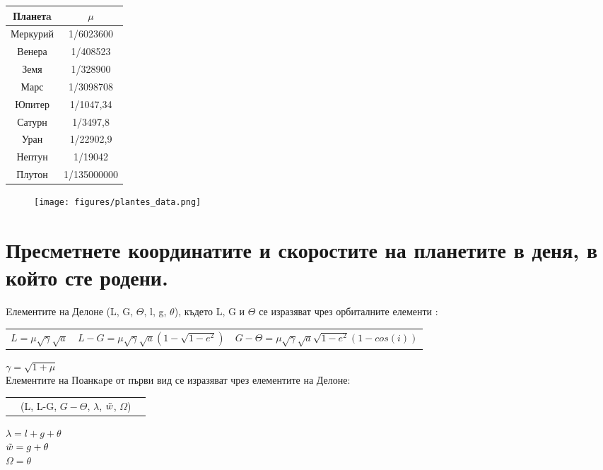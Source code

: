 \documentclass{article}
\begin{document}
\begin{center}
 \begin{tabular}{||c | c||} 
 \hline
 Планетa & $\mu$  \\ [0.5ex] 
 \hline\hline
 Меркурий & 1/6023600 \\ 
 \hline
 Венера & 1/408523  \\
 \hline
 Земя & 1/328900  \\
 \hline
 Марс & 1/3098708  \\
 \hline
 Юпитер & 1/1047,34 \\
 \hline
 Сатурн & 1/3497,8  \\
 \hline
 Уран & 1/22902,9  \\
 \hline
 Нептун & 1/19042  \\
 \hline
 Плутон & 1/135000000  \\[1ex]
 \hline
\end{tabular}
\end{center}

\begin{figure}[h]
\centering
\texttt{[image: figures/plantes\_data.png]}
\end{figure}

\section{Пресметнете координатите и скоростите на планетите в деня, в който сте родени.}
Eлементите на Делоне (L, G, $\Theta$, l, g, $\theta$), където L, G и $\Theta$ се изразяват чрез орбиталните елементи : \\

\setlength{\tabcolsep}{30pt} %
\renewcommand{\arraystretch}{1.5} %

\begin{center}
\begin{tabular}{ c |  c  | c } 

 $L = \mu \sqrt{\gamma} \sqrt{a} $   & $L - G = \mu \sqrt{\gamma} \sqrt{a}(1-\sqrt{1-e^2})$ & $G - \Theta = \mu  \sqrt{\gamma}  \sqrt{a}  \sqrt{1-e^2} (1- cos(i)) $ \\ 

\end{tabular}
\end{center}

 $\gamma = \sqrt{1+\mu}$ \\


\setlength{\tabcolsep}{6pt} %
\renewcommand{\arraystretch}{1} %
\noindent Елементите на Поанкaре от първи вид се изразяват чрез елементите на Делоне:\\
\begin{center}
\begin{tabular}{ c   c   c } 
    &(L, L-G, $G-\Theta$, $\lambda $, $\Tilde{w}$, $\Omega$)&
\end{tabular}
\end{center}
$\lambda = l + g + \theta$\\
$\Tilde{w} = g + \theta$\\
$\Omega = \theta$\\
\end{document}
